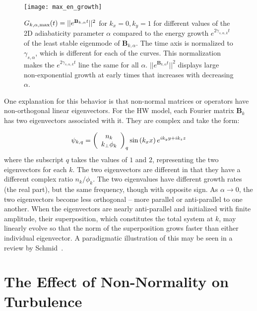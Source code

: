 \documentclass[letter,scriptaddress,twocolumn, prl,showkeys]{revtex4}
\def\beq{\begin{equation}}
\def\eeq{\end{equation}}
\begin{document}
\begin{figure}
\centerline{\texttt{[image: max\_en\_growth]}}
\caption{$G_{k,\alpha,\rm{max}}(t) = ||e^{\mathbf{B}_{k,\alpha} t}||^2$ for $k_x=0, k_y=1$ for different values of the 2D adiabaticity parameter 
$\alpha$ compared to the energy growth $e^{2 \gamma_{s,\alpha,k} t}$ of the least stable eigenmode of  $\mathbf{B}_{k,\alpha}$. 
The time axis is normalized to $\gamma_{s,\alpha}$, which is different for each of the curves. This normalization makes the $e^{2 \gamma_{s,\alpha,k} t}$ line the same for all $\alpha$. 
$||e^{\mathbf{B}_{k,\alpha} t}||^2$ displays large non-exponential growth at early times that increases with decreasing $\alpha$.}
\label{max_en_growth}
\end{figure}

One explanation for this behavior is that non-normal matrices or operators have non-orthogonal linear eigenvectors. For the HW model, each Fourier matrix $\mathbf{B}_k$ has two eigenvectors associated
with it. They are complex and take the form:

\beq
\label{lin_eigen_form}
\psi_{k,q} = \left( \begin{array}{cc} n_k \\ k_\perp \phi_k \end{array} \right)_q {\rm sin} \left( k_x x \right) e^{i k_y y + i k_z z} 
\eeq
where the subscript $q$ takes the values of $1$ and $2$, representing the two eigenvectors for each $k$. The two eigenvectors are different in that they have a different complex ratio $n_k/\phi_k$.
The two eigenvalues have different growth rates (the real part), but the same frequency, though with opposite sign.
As $\alpha \to 0$, the two eigenvectors become less orthogonal -- more parallel or anti-parallel to one another. When the eigenvectors are nearly anti-parallel and initialized with finite amplitude,
their superposition, which constitutes the total system at $k$, may linearly evolve so that the norm of the superposition grows faster than either individual eigenvector. A paradigmatic illustration
of this may be seen in a review by Schmid~\cite{schmid2007}.

\section{The Effect of Non-Normality on Turbulence}
\end{document}
